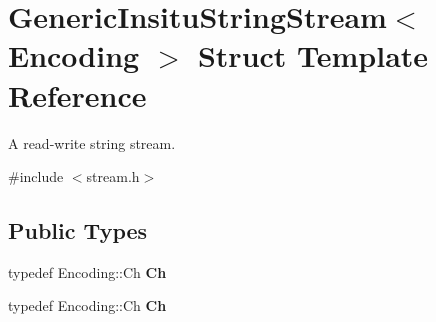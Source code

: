\hypertarget{struct_generic_insitu_string_stream}{}\section{Generic\+Insitu\+String\+Stream$<$ Encoding $>$ Struct Template Reference}
\label{struct_generic_insitu_string_stream}


A read-\/write string stream.  




{\ttfamily \#include $<$stream.\+h$>$}

\subsection*{Public Types}
\begin{DoxyCompactItemize}
\item 
typedef Encoding\+::\+Ch {\bfseries Ch}\hypertarget{struct_generic_insitu_string_stream_a277308a58f551f11d0d9a20823702b5a}{}\label{struct_generic_insitu_string_stream_a277308a58f551f11d0d9a20823702b5a}

\item 
typedef Encoding\+::\+Ch {\bfseries Ch}\hypertarget{struct_generic_insitu_string_stream_a277308a58f551f11d0d9a20823702b5a}{}\label{struct_generic_insitu_string_stream_a277308a58f551f11d0d9a20823702b5a}

\end{DoxyCompactItemize}
